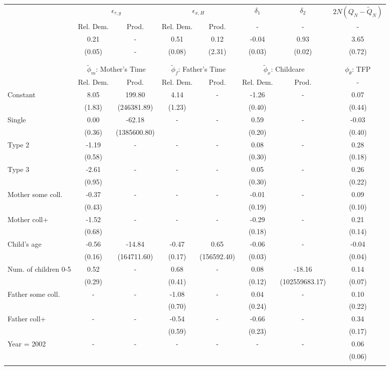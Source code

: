 \begin{tabular}{lccccccc}\toprule
 & \multicolumn{2}{c}{$\epsilon_{\tau,g}$} & \multicolumn{2}{c}{$\epsilon_{x,H}$} & {$\delta_{1}$} & {$\delta_{2}$} & $2N(Q_{N} - \tilde{Q}_{N})$ \\
 & Rel. Dem. & Prod. & Rel. Dem. & Prod. & - & - & - \\\cmidrule(r){2-3}\cmidrule(r){4-5}\cmidrule(r){6-6}\cmidrule(r){7-7}\cmidrule(r){8-8}
&0.21& - &0.51&0.12&-0.04&0.93&3.65\\
&(0.05)& - &(0.08)&(2.31)&(0.03)&(0.02)&(0.72)\\
\\
&&&&&&&\\
 & \multicolumn{2}{c}{$\tilde{\phi}_{m}$: Mother's Time} & \multicolumn{2}{c}{$\tilde{\phi}_{f}$: Father's Time} & \multicolumn{2}{c}{$\tilde{\phi}_{x}$: Childcare} &{$\phi_{\theta}$: TFP} \\
 & Rel. Dem. & Prod. & Rel. Dem. & Prod. & Rel. Dem. & Prod. & -  \\\cmidrule(r){2-3}\cmidrule(r){4-5}\cmidrule(r){6-7}\cmidrule(r){8-8}
Constant&8.05&199.80&4.14& -&-1.26& -&0.07\\
&(1.83)&(246381.89)&(1.23)&&(0.40)&&(0.44)\\
Single&0.00&-62.18& - & -&0.59& -&-0.03\\
&(0.36)&(1385600.80) & &&(0.20)&&(0.40)\\
Type 2&-1.19& -& - & -&0.08& -&0.28\\
&(0.58)& & &&(0.30)&&(0.18)\\
Type 3&-2.61& -& - & -&0.05& -&0.26\\
&(0.95)& & &&(0.30)&&(0.22)\\
Mother some coll.&-0.37& -& - & -&-0.01& -&0.09\\
&(0.43)& & &&(0.19)&&(0.10)\\
Mother coll+&-1.52& -& - & -&-0.29& -&0.21\\
&(0.68)& & &&(0.18)&&(0.14)\\
Child's age&-0.56&-14.84&-0.47&0.65&-0.06& -&-0.04\\
&(0.16)&(164711.60)&(0.17)&(156592.40)&(0.03)&&(0.04)\\
Num. of children 0-5&0.52& -&0.68& -&0.08&-18.16&0.14\\
&(0.29)&&(0.41)&&(0.12)&(102559683.17)&(0.07)\\
Father some coll.& - & -&-1.08& -&0.04& -&0.10\\
 & &&(0.70)&&(0.24)&&(0.22)\\
Father coll+& - & -&-0.54& -&-0.66& -&0.34\\
 & &&(0.59)&&(0.23)&&(0.17)\\
Year = 2002& - & -& - & -& - & -&0.06\\
 & & & & & &&(0.06)\\
\\
\bottomrule\end{tabular}